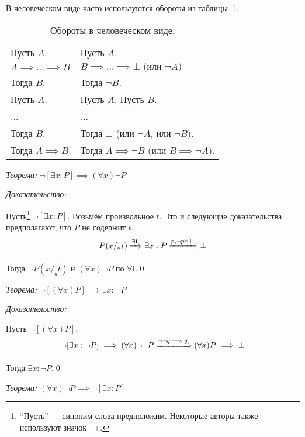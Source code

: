 В человеческом виде часто используются обороты из таблицы~\ref{table:human_form}.
\begin{table}
	\centering
	\begin{tabular}{l|l}
		Пусть $A$.                 & Пусть $A$.                                   \\
		$A\implies ... \implies B$ & $B\implies ...\implies \bot
		\text{ (или $\lnot A$)}$                                                  \\
		Тогда $B$.                 & Тогда $\lnot B$.                             \\\hline
		Пусть $A$.                 & Пусть  $A$. Пусть $B$.                       \\
		...                        & ...                                          \\
		Тогда $B$.                 & Тогда $\bot$ (или $\lnot A$, или $\lnot B$). \\
		Тогда $A\implies B$.       & Тогда $A\implies \lnot B$
		(или $B\implies\lnot A$).
	\end{tabular}
	\caption{Обороты в человеческом виде.}\label{table:human_form}
\end{table}

\vspace{1em}
{\it Теорема:} $\lnot[\exists x:P]\implies (\forall x)\lnot P$

{\it Доказательство:}

Пусть\footnote{
	``Пусть'' --- синоним слова предположим. Некоторые авторы также
	используют значок $\sqsupset$.
} $\lnot[\exists x:P]$. Возьмём произвольное $t$. Это и следующие доказательства
предполагают, что $P$ не содержит $t$.
\[
	P(x/_{a}t)\xRightarrow{\text{$\exists$I}} \exists x:P
	\xRightarrow{p,\lnot p\vdash\bot} \bot
\]

Тогда $\lnot P(x/_{a}t)$ и $(\forall x)\lnot P$
по $\forall$I.\qed

\vspace{1em}
{\it Теорема:} $\lnot[(\forall x)P]\implies \exists x:\lnot P$

{\it Доказательство:}

Пусть $\lnot[(\forall x)P]$.
\[
	\lnot[\exists x:\lnot P]\implies (\forall x)\lnot\lnot P
	\xRightarrow{\lnot\lnot q\implies q} (\forall x)P\implies\bot
\]

Тогда $\exists x:\lnot P$.\qed

\vspace{1em}
{\it Теорема:} $(\forall x)\lnot P\implies \lnot[\exists x:P]$

